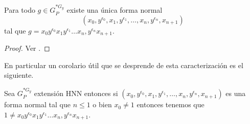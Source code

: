 \documentclass[tesis.tex]{subfiles}
\begin{document}
\begin{prop}[Britton]\label{teo_britton}
	Para todo $g \in G_P^{\ast G_y}$ existe una única forma normal 
	\[
	(x_{0},y^{\epsilon_0},x_{1},y^{\epsilon_1}, \dots, x_{n},y^{\epsilon_n},x_{n+1})
	\]
	tal que $g = x_{0}y^{\epsilon_0}x_{1}y^{\epsilon_1} \dots x_{n},y^{\epsilon_n}x_{n+1}$.
\end{prop}
\begin{proof}
	Ver \cite[p.182]{lyndon1977combinatorial}.
\end{proof}

En particular un corolario útil que se desprende de esta caracterización es el siguiente.

\begin{coro}\label{coro_hnn_neq_1}
	Sea $G_P^{\ast G_y}$ extensión HNN entonces si $(x_{0},y^{\epsilon_0},x_{1},y^{\epsilon_1}, \dots, x_{n},y^{\epsilon_n},x_{n+1})$ es una forma normal tal que $n \le 1$ o bien $x_{0} \neq 1$
	 entonces tenemos que $1 \neq x_{0}y^{\epsilon_0}x_{1}y^{\epsilon_1} \dots x_{n},y^{\epsilon_n}x_{n+1}$.
\end{coro}

%
%
\end{document}
